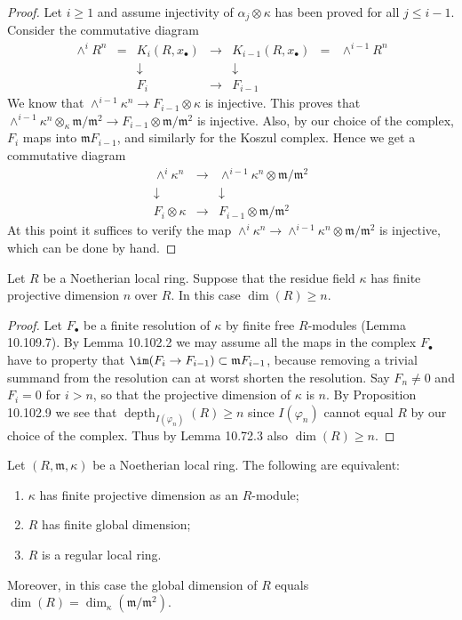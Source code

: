 \begin{proof}
Let $i\geq1$ and assume injectivity of $\alpha_j\otimes\kappa$ has been proved for all $j\leq i-1$. Consider the commutative diagram
\[
\begin{matrix}
\wedge^iR^n&=&K_i(R,x_\bullet)&\to&K_{i-1}(R,x_\bullet)&=&\wedge^{i-1}R^n\\
&&\downarrow&&\downarrow&&\\
&&F_i&\to&F_{i-1}&&
\end{matrix}
\]
We know that $\wedge^{i-1}\kappa^n\to F_{i-1}\otimes\kappa$ is injective. This proves that $\wedge^{i-1}\kappa^n\otimes_\kappa\mathfrak m/\mathfrak m^2\to F_{i-1}\otimes\mathfrak m/\mathfrak m^2$ is injective. Also, by our choice of the complex, $F_i$ maps into $\mathfrak mF_{i-1}$, and similarly for the Koszul complex. Hence we get a commutative diagram
\[
\begin{matrix}
\wedge^i\kappa^n&\to&\wedge^{i-1}\kappa^n\otimes\mathfrak m/\mathfrak m^2\\
\downarrow&&\downarrow\\
F_i\otimes\kappa&\to&F_{i-1}\otimes\mathfrak m/\mathfrak m^2
\end{matrix}
\]
At this point it suffices to verify the map $\wedge^i\kappa^n\to\wedge^{i-1}\kappa^n\otimes\mathfrak m/\mathfrak m^2$ is injective, which can be done by hand.
\end{proof}
\begin{lemma}[10.110.4]
Let $R$ be a Noetherian local ring. Suppose that the residue field $\kappa$ has finite projective dimension $n$ over $R$. In this case $\dim(R)\geq n$.
\end{lemma}
\begin{proof}
Let $F_\bullet$ be a finite resolution of $\kappa$ by finite free $R$-modules (Lemma 10.109.7). By Lemma 10.102.2 we may assume all the maps in the complex $F_\bullet$ have to property that $\im(F_i\to F_{i-1})\subset\mathfrak mF_{i-1}$, because removing a trivial summand from the resolution can at worst shorten the resolution. Say $F_n\ne0$ and $F_i=0$ for $i>n$, so that the projective dimension of $\kappa$ is $n$. By Proposition 10.102.9 we see that $\operatorname{depth}_{I(\varphi_n)}(R)\geq n$ since $I(\varphi_n)$ cannot equal $R$ by our choice of the complex. Thus by Lemma 10.72.3 also $\dim(R)\geq n$.
\end{proof}
\begin{proposition}[10.110.5]
Let $(R,\mathfrak m,\kappa)$ be a Noetherian local ring. The following are equivalent:
\begin{enumerate}
\item $\kappa$ has finite projective dimension as an $R$-module;
\item $R$ has finite global dimension;
\item $R$ is a regular local ring.
\end{enumerate}
Moreover, in this case the global dimension of $R$ equals $\dim(R)=\dim_\kappa(\mathfrak m/\mathfrak m^2)$.
\end{proposition}
